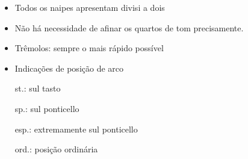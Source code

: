 \documentclass[11pt]{article}
\begin{document}
\begin{itemize}
\item Todos os naipes apresentam divisi a dois

\item Não há necessidade de afinar os quartos de tom precisamente.

\item Trêmolos: sempre o mais rápido possível

\item Indicações de posição de arco

st.: sul tasto

sp.: sul ponticello

esp.: extremamente sul ponticello

ord.: posição ordinária
\end{itemize}
\end{document}
